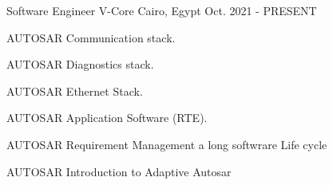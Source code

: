 

\begin{cventries}

  \cventry
    {\normalsize Software Engineer} %
    {\Large V-Core} %
    {\normalsize Cairo, Egypt} %
    {\normalsize Oct. 2021 - PRESENT} %
    {
      \begin{cvitems} %
        \item {\normalsize AUTOSAR Communication stack.}
        \item {\normalsize AUTOSAR Diagnostics stack.}
        \item {\normalsize AUTOSAR Ethernet Stack.}
        \item {\normalsize AUTOSAR Application Software (RTE).}
        \item {\normalsize AUTOSAR Requirement Management a long softwrare Life cycle}
        \item {\normalsize AUTOSAR Introduction to Adaptive Autosar}
      \end{cvitems}
    }
\end{cventries}
